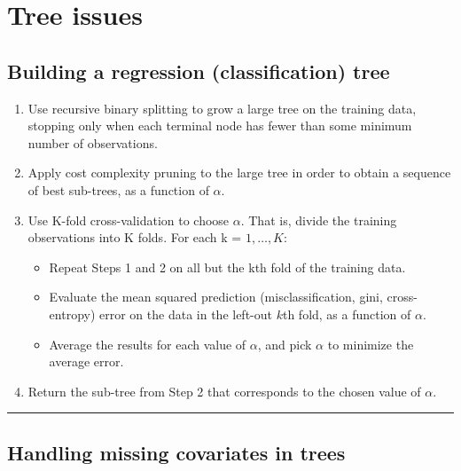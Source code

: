 \documentclass[
  letterpaper,
  DIV=11,
  numbers=noendperiod]{scrartcl}
\providecommand{\tightlist}{%
  \setlength{\itemsep}{0pt}\setlength{\parskip}{0pt}}\usepackage{longtable,booktabs,array}
\begin{document}
\hypertarget{tree-issues}{%
\section{Tree issues}\label{tree-issues}}

\hypertarget{building-a-regression-classification-tree}{%
\subsection{Building a regression (classification)
tree}\label{building-a-regression-classification-tree}}

\begin{enumerate}
\def\labelenumi{\arabic{enumi}.}
\tightlist
\item
  Use recursive binary splitting to grow a large tree on the training
  data, stopping only when each terminal node has fewer than some
  minimum number of observations.
\item
  Apply cost complexity pruning to the large tree in order to obtain a
  sequence of best sub-trees, as a function of \(\alpha\).
\item
  Use K-fold cross-validation to choose \(\alpha\). That is, divide the
  training observations into K folds. For each k = \(1,\ldots, K\):

  \begin{itemize}
  \tightlist
  \item
    Repeat Steps 1 and 2 on all but the kth fold of the training data.
  \item
    Evaluate the mean squared prediction (misclassification, gini,
    cross-entropy) error on the data in the left-out \(k\)th fold, as a
    function of \(\alpha\).
  \item
    Average the results for each value of \(\alpha\), and pick
    \(\alpha\) to minimize the average error.
  \end{itemize}
\item
  Return the sub-tree from Step 2 that corresponds to the chosen value
  of \(\alpha\).
\end{enumerate}

\begin{center}\rule{0.5\linewidth}{0.5pt}\end{center}

\hypertarget{handling-missing-covariates-in-trees}{%
\subsection{Handling missing covariates in
trees}\label{handling-missing-covariates-in-trees}}
\end{document}
